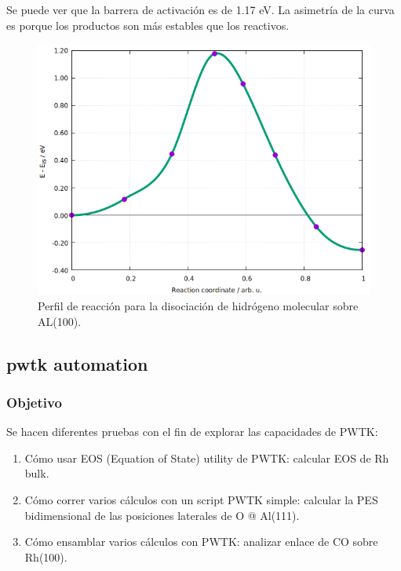   Se puede ver que la barrera de activación es de 1.17 eV. La asimetría de la curva es porque los productos son más estables que los reactivos.

   \begin{figure}[H]
       \centering
        \includegraphics[scale = 0.45]{figs/D3/diss.png}
        \caption{Perfil de reacción para la disociación de hidrógeno molecular sobre AL(100).}
    \end{figure}

\subsection{pwtk automation}

\subsubsection{Objetivo}

  Se hacen diferentes pruebas con el fin de explorar las capacidades de PWTK:
    \begin{enumerate}
      \item Cómo usar EOS (Equation of State) utility de PWTK: calcular EOS de Rh bulk.
      \item Cómo correr varios cálculos con un script PWTK simple: calcular la PES bidimensional de las posiciones laterales de O @ Al(111).
      \item Cómo ensamblar varios cálculos con PWTK: analizar enlace de CO sobre Rh(100).
    \end{enumerate}


